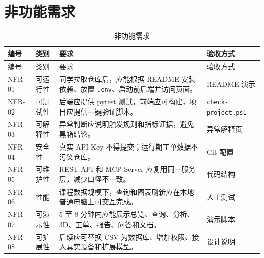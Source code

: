 \documentclass[12pt,a4paper]{ctexart}
\newcommand{\code}[1]{{\footnotesize\nolinkurl{#1}}}
\begin{document}
\section{非功能需求}
\begin{longtable}{p{2cm}p{3.4cm}p{6.5cm}p{2.6cm}}
\caption{非功能需求}\\
\toprule
编号 & 类别 & 要求 & 验收方式 \\
\midrule
\endfirsthead
\toprule
编号 & 类别 & 要求 & 验收方式 \\
\midrule
\endhead
NFR-01 & 可运行性 & 同学拉取仓库后，应能根据 README 安装依赖、放置 \code{.env}、启动前后端并访问页面。 & README 演示 \\
NFR-02 & 可测试性 & 后端应提供 pytest 测试，前端应可构建，项目应提供一键验证脚本。 & \code{check-project.ps1} \\
NFR-03 & 可解释性 & 异常判断应说明触发规则和指标证据，避免黑箱结论。 & 异常解释页 \\
NFR-04 & 安全性 & 真实 API Key 不得提交；运行期工单数据不污染仓库。 & Git 配置 \\
NFR-05 & 可维护性 & REST API 和 MCP Server 应复用同一服务层，减少口径不一致。 & 代码结构 \\
NFR-06 & 性能 & 课程数据规模下，查询和图表刷新应在本地普通电脑上可交互完成。 & 人工测试 \\
NFR-07 & 可演示性 & 5 至 8 分钟内应能展示总览、查询、分析、3D、工单、报告、问答和文档。 & 演示脚本 \\
NFR-08 & 可扩展性 & 后续应可替换 CSV 为数据库、增加权限、接入真实设备和扩展模型。 & 设计说明 \\
\bottomrule
\end{longtable}
\end{document}
